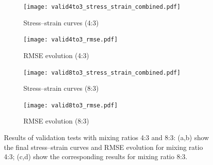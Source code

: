 

    \begin{figure}[H]
    \centering

    \begin{subfigure}[t]{0.47\textwidth}
        \centering
        \texttt{[image: valid4to3\_stress\_strain\_combined.pdf]}
        \caption{Stress–strain curves (4:3)}
        \label{fig:validation_stress_strain_4to3}
    \end{subfigure}
    \hfill
    \begin{subfigure}[t]{0.47\textwidth}
        \centering
        \texttt{[image: valid4to3\_rmse.pdf]}
        \caption{RMSE evolution (4:3)}
        \label{fig:validation_rmse_4to3}
    \end{subfigure}

    \vspace{1em} %

    \begin{subfigure}[t]{0.47\textwidth}
        \centering
        \texttt{[image: valid8to3\_stress\_strain\_combined.pdf]}
        \caption{Stress–strain curves (8:3)}
        \label{fig:validation_stress_strain_8to3}
    \end{subfigure}
    \hfill
    \begin{subfigure}[t]{0.47\textwidth}
        \centering
        \texttt{[image: valid8to3\_rmse.pdf]}
        \caption{RMSE evolution (8:3)}
        \label{fig:validation_rmse_8to3}
    \end{subfigure}

    \caption{Results of validation tests with mixing ratios 4:3 and 8:3:
    (a,b) show the final stress–strain curves and RMSE evolution for mixing ratio 4:3;
    (c,d) show the corresponding results for mixing ratio 8:3.}
    \label{fig:validation_results}
\end{figure}

